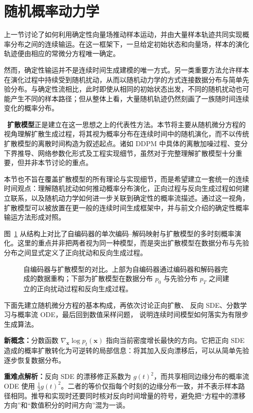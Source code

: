 \documentclass[UTF8,a4paper,zihao=-4,oneside,openany]{ctexbook}
\makeatletter
\newcommand{\AMLFigure}[2][0.96\linewidth]{%
  \begingroup
  \let\AtBeginDocument\@gobble
  \endgroup
}
\makeatother
\begin{document}
\section{随机概率动力学}

上一节讨论了如何利用确定性向量场推动样本运动，并由大量样本轨迹共同实现概率分布之间的连续输运。在这一框架下，一旦给定初始状态和向量场，样本的演化轨迹便由相应的常微分方程唯一确定。

然而，确定性输运并不是连续时间生成建模的唯一方式。另一类重要方法允许样本在演化过程中持续受到随机扰动，从而以随机动力学的方式连接数据分布与简单先验分布。与确定性流相比，此时即使从相同的初始状态出发，不同的随机扰动也可能产生不同的样本路径；但从整体上看，大量随机轨迹仍然刻画了一族随时间连续变化的概率分布。

~\textbf{扩散模型}正是建立在这一思想之上的代表性方法。本节将主要从随机微分方程的视角理解扩散生成过程，将其视为概率分布在连续时间中的随机演化，而不以传统扩散模型的离散时间构造为叙述起点。诸如 DDPM 中具体的离散加噪过程、变分下界推导、网络参数化形式及工程实现细节，虽然对于完整理解扩散模型十分重要，但并非本节讨论的重点。

本节也不旨在覆盖扩散模型的所有理论与实现细节，而是希望建立一套统一的连续时间观点：理解随机扰动如何推动概率分布演化，正向过程与反向生成过程如何建立联系，以及随机动力学如何进一步关联到确定性的概率流描述。通过这一视角，扩散模型可以被放置在更一般的连续时间生成框架中，并与前文介绍的确定性概率输运方法形成对照。

图~\ref{fig:autoencoder} 从结构上对比了自编码器的单次编码--解码映射与扩散模型的多时刻概率演化。这里的重点并非把两者视为同一种模型，而是突出扩散模型在数据分布与先验分布之间显式定义了正向扰动和反向生成过程。

\begin{figure}[!t]
\centering
\AMLFigure{figure-autoencoder}
\caption{自编码器与扩散模型的对比。上部为自编码器通过编码器和解码器完成的数据重构；下部为扩散模型在数据分布 \(p_0\) 与先验分布 \(p_T\) 之间建立的正向扰动过程和反向生成过程。}
\label{fig:autoencoder}
\end{figure}

下面先建立随机微分方程的基本构成，再依次讨论正向扩散、
反向 SDE、分数学习与概率流 ODE，最后回到数值采样问题，
说明连续时间模型如何落实为有限步生成算法。

\begin{importantnote}
\textbf{新概念：}分数函数 \(\nabla_{\boldsymbol{x}}\log p_t(\boldsymbol{x})\) 指向当前密度增长最快的方向。它把正向 SDE 造成的概率扩散转化为可逆转的局部信息：将其加入反向漂移后，可以从简单先验逐步恢复数据分布。

\textbf{重难点解析：}反向 SDE 的漂移修正系数为 \(g(t)^2\)，而共享相同边缘分布的概率流 ODE 使用 \(\tfrac12 g(t)^2\)。二者的等价仅指每个时刻的边缘分布一致，并不表示样本路径相同。推导和实现时还要同时核对反向时间增量的符号，避免把“方程中的漂移方向”和“数值积分的时间方向”混为一谈。
\end{importantnote}
\end{document}
